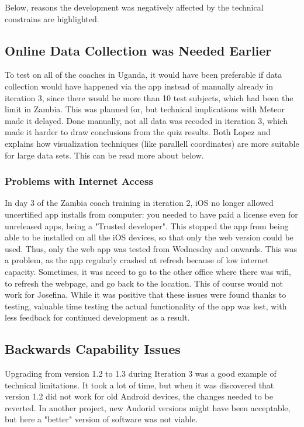 Below, reasons the development was negatively affected by the technical constrains are highlighted.

\subsection{Online Data Collection was Needed Earlier}
To test on all of the coaches in Uganda, it would have been preferable if data collection would have happened via the app instead of manually already in iteration 3, since there would be more than 10 test subjects, which had been the limit in Zambia. This was planned for, but technical implications with Meteor made it delayed. Done manually, not all data was recoded in iteration 3, which made it harder to draw conclusions from the quiz results. Both Lopez \cite{une-terre} and \cite{timo-ropinski-liu} explains how visualization techniques (like parallell coordinates) are more suitable for large data sets. This can be read more about below.

\subsubsection{Problems with Internet Access}
In day 3 of the Zambia coach training in iteration 2, iOS no longer allowed uncertified app installs from computer: you needed to have paid a license even for unreleased apps, being a "Trusted developer". This stopped the app from being able to be installed on all the iOS devices, so that only the web version could be used. Thus, only the web app was tested from Wednesday and onwards. This was a problem, as the app regularly crashed at refresh because of low internet capacity. Sometimes, it was neeed to go to the other office where there was wifi, to refresh the webpage, and go back to the location. This of course would not work for Josefina. While it was positive that these issues were found thanks to testing, valuable time testing the actual functionality of the app was lost, with less feedback for continued development as a result.

\subsection{Backwards Capability Issues} \label{backwards-capability}
Upgrading from version 1.2 to 1.3 during Iteration 3 was a good example of technical limitations. It took a lot of time, but when it was discovered that version 1.2 did not work for old Android devices, the changes needed to be reverted. In another project, new Andorid versions might have been acceptable, but here a "better" version of software was not viable.

